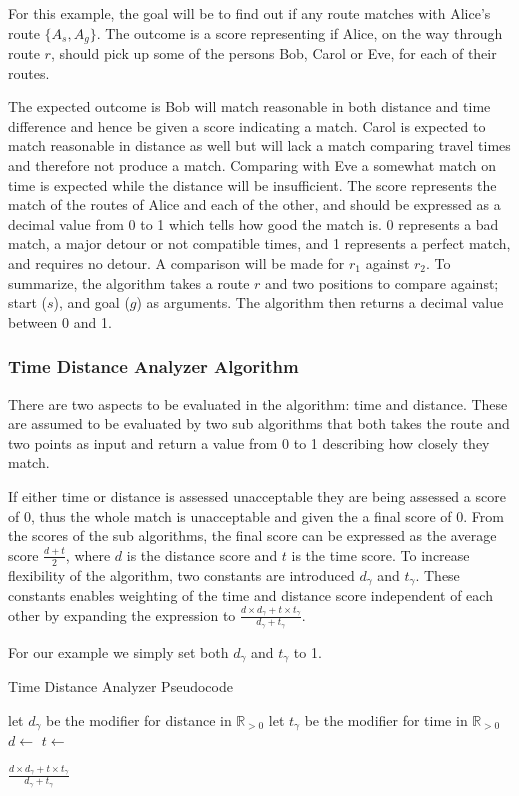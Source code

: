 For this example, the goal will be to find out if any route matches with Alice's route $\{A_s,A_g\}$.
The outcome is a score representing if Alice, on the way through route $r$, should pick up some of the persons Bob, Carol or Eve, for each of their routes.

The expected outcome is Bob will match reasonable in both distance and time difference and hence be given a score indicating a match.
Carol is expected to match reasonable in distance as well but will lack a match comparing travel times and therefore not produce a match.
Comparing with Eve a somewhat match on time is expected while the distance will be insufficient.
The score represents the match of the routes of Alice and each of the other, and should be expressed as a decimal value from 0 to 1 which tells how good the match is.
0 represents a bad match, a major detour or not compatible times, and 1 represents a perfect match, and requires no detour.
A comparison will be made for $r_1$ against $r_2$.
To summarize, the algorithm takes a route $r$ and two positions to compare against; start ($s$), and goal ($g$) as arguments.
The algorithm then returns a decimal value between 0 and 1.

\subsubsection{Time Distance Analyzer Algorithm}
There are two aspects to be evaluated in the algorithm: time and distance.
These are assumed to be evaluated by two sub algorithms that both takes the route and two points as input and return a value from 0 to 1 describing how closely they match.

If either time or distance is assessed unacceptable they are being assessed a score of 0, thus the whole match is unacceptable and given the a final score of 0.
From the scores of the sub algorithms, the final score can be expressed as the average score $\frac{d+t}{2}$, where $d$ is the distance score and $t$ is the time score.
To increase flexibility of the algorithm, two constants are introduced $d_\gamma$ and $t_\gamma$.
These constants enables weighting of the time and distance score independent of each other by expanding the expression to $\frac{d\times d_\gamma+t\times t_\gamma}{d_\gamma+t_\gamma}$.

For our example we simply set both $d_\gamma$ and $t_\gamma$ to 1. 

\begin{algorithm}
	\caption{Time Distance Analyzer Pseudocode}
	\label{alg:timedistanalyser}
	\begin{algorithmic}[1]
		\Require 
		\Statex let $d_\gamma$ be the modifier for distance in $\mathbb{R}_{>0}$
		\Statex let $t_\gamma$ be the modifier for time in $\mathbb{R}_{>0}$
		\Statex 
			\State $d\gets$
			\State $t\gets$
			
				\State \Return $\frac{d\times d_\gamma+t\times t_\gamma}{d_\gamma+t_\gamma}$
			\Else
				\State{}
			\EndIf
		\EndFunction
	\end{algorithmic}
\end{algorithm}

